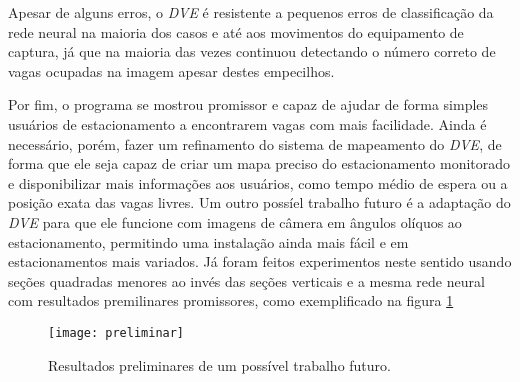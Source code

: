 Apesar de alguns erros, o \textit{DVE} é resistente a pequenos erros de classificação da rede neural na maioria dos casos e até aos movimentos do equipamento de captura, já que na maioria das vezes continuou detectando o número correto de vagas ocupadas na imagem apesar destes empecilhos.

Por fim, o programa se mostrou promissor e capaz de ajudar de forma simples usuários de estacionamento a encontrarem vagas com mais facilidade. Ainda é necessário, porém, fazer um refinamento do sistema de mapeamento do \textit{DVE}, de forma que ele seja capaz de criar um mapa preciso do estacionamento monitorado e disponibilizar mais informações aos usuários, como tempo médio de espera ou a posição exata das vagas livres. Um outro possíel trabalho futuro é a adaptação do \textit{DVE} para que ele funcione com imagens de câmera em ângulos olíquos ao estacionamento, permitindo uma instalação ainda mais fácil e em estacionamentos mais variados. Já foram feitos experimentos neste sentido usando seções quadradas menores ao invés das seções verticais e a mesma rede neural com resultados premilinares promissores, como exemplificado na figura \ref{fig:preliminares}

\begin{figure}%
\centering
\texttt{[image: preliminar]}%
\caption{Resultados preliminares de um possível trabalho futuro.}%
\label{fig:preliminares}%
\centering
\end{figure}










